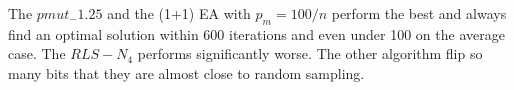 The $pmut_-1.25$ and the (1+1) EA with $p_m=100/n$ perform the best and always find an optimal solution within 600 iterations and even under 100 on the average case.
The $RLS-N_4$ performs significantly worse.
The other algorithm flip so many bits that they are almost close to random sampling.





